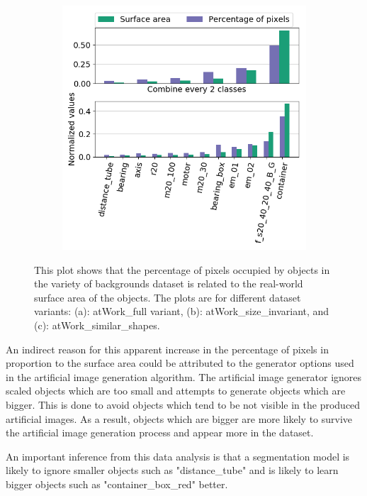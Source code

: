 \begin{figure}
\begin{subfigure}{.47\textwidth}
				\includegraphics[width=1\linewidth]{images/analyzer_shape}
				\caption{}
				\label{Fig:analyzerc}
			\end{subfigure}
			\caption{This plot shows that the percentage of pixels occupied by objects in the variety of backgrounds dataset is related to the real-world surface area of the objects. The plots are for different dataset variants: (a): atWork\_full variant, (b): atWork\_size\_invariant, and (c): atWork\_similar\_shapes.}
			\label{Fig:analyzer}
		\end{figure}		
		
An indirect reason for this apparent increase in the percentage of pixels in proportion to the surface area could be attributed to the generator options used in the artificial image generation algorithm. The artificial image generator ignores scaled objects which are too small and attempts to generate objects which are bigger. This is done to avoid objects which tend to be not visible in the produced artificial images. As a result, objects which are bigger are more likely to survive the artificial image generation process and appear more in the dataset. 

An important inference from this data analysis is that a segmentation model is likely to ignore smaller objects such as "distance\_tube" and is likely to learn bigger objects such as "container\_box\_red" better. 

